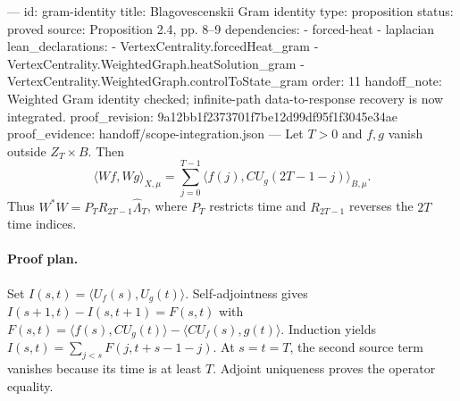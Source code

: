 ---
id: gram-identity
title: Blagovescenskii Gram identity
type: proposition
status: proved
source: Proposition 2.4, pp. 8–9
dependencies:
- forced-heat
- laplacian
lean_declarations:
- VertexCentrality.forcedHeat_gram
- VertexCentrality.WeightedGraph.heatSolution_gram
- VertexCentrality.WeightedGraph.controlToState_gram
order: 11
handoff_note: Weighted Gram identity checked; infinite-path data-to-response recovery is now integrated.
proof_revision: 9a12bb1f2373701f7be12d99df95f1f3045e34ae
proof_evidence: handoff/scope-integration.json
---
Let $T>0$ and $f,g$ vanish outside $Z_T\times B$. Then \[\langle Wf,Wg\rangle_{X,\mu}=\sum_{j=0}^{T-1}\langle f(j),CU_g(2T-1-j)\rangle_{B,\mu}.\] Thus $W^*W=P_TR_{2T-1}\widehat\Lambda_T$, where $P_T$ restricts time and $R_{2T-1}$ reverses the $2T$ time indices.

\paragraph{Proof plan.}
Set $I(s,t)=\langle U_f(s),U_g(t)\rangle$. Self-adjointness gives $I(s+1,t)-I(s,t+1)=F(s,t)$ with $F(s,t)=\langle f(s),CU_g(t)\rangle-\langle CU_f(s),g(t)\rangle$. Induction yields $I(s,t)=\sum_{j<s}F(j,t+s-1-j)$. At $s=t=T$, the second source term vanishes because its time is at least $T$. Adjoint uniqueness proves the operator equality.
